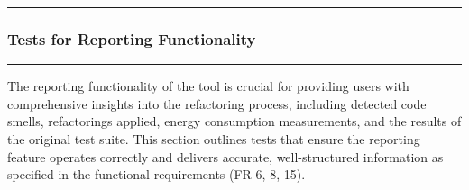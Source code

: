 \documentclass[12pt, titlepage]{article}
\newcommand{\colorrule}{\textcolor{BlueViolet}{\rule{\linewidth}{2pt}}}
\begin{document}
\begin{enumerate}[label={\bf
    \textcolor{Maroon}{test-FR-IA-\arabic*}}, wide=0pt, font=\itshape]
\end{enumerate}

\newpage

\noindent
\colorrule

\subsubsection{Tests for Reporting Functionality}
\colorrule

\medskip

\noindent
The reporting functionality of the tool is crucial for providing
users with comprehensive insights into the refactoring process,
including detected code smells, refactorings applied, energy
consumption measurements, and the results of the original test suite.
This section outlines tests that ensure the reporting feature
operates correctly and delivers accurate, well-structured information
as specified in the functional requirements (FR 6, 8, 15).
\end{document}
